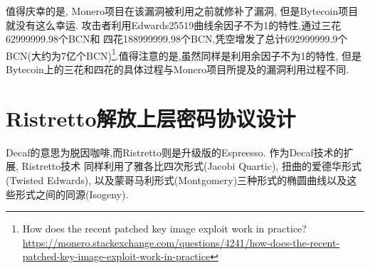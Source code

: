 \documentclass{article}
\begin{document}
值得庆幸的是, Monero项目在该漏洞被利用之前就修补了漏洞, 但是Bytecoin项目就没有这么幸运.
攻击者利用Edwards25519曲线余因子不为1的特性,通过三花62999999.98个BCN和
四花188999999.98个BCN,凭空增发了总计692999999.9个BCN(大约为7亿个BCN)\footnote{
How does the recent patched key image exploit work in practice?
\url{https://monero.stackexchange.com/questions/4241/how-does-the-recent-patched-key-image-exploit-work-in-practice}}.值得注意的是,虽然同样是利用余因子不为1的特性,
但是Bytecoin上的三花和四花的具体过程与Monero项目所提及的漏洞利用过程不同.


\section{Ristretto解放上层密码协议设计}

Decaf的意思为脱因咖啡,而Ristretto则是升级版的Espreesso. 作为Decaf技术的扩展, Ristretto技术
同样利用了雅各比四次形式(Jacobi Quartic), 扭曲的爱德华形式(Twisted Edwards),
以及蒙哥马利形式(Montgomery)三种形式的椭圆曲线以及这些形式之间的同源(Isogeny).
\end{document}
